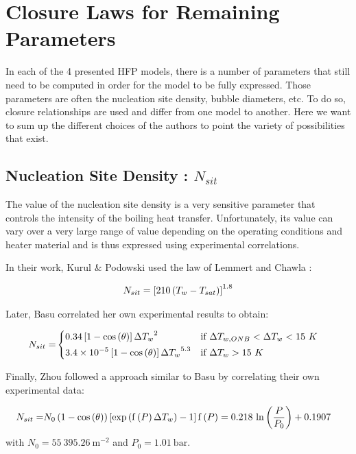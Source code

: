 \section{Closure Laws for Remaining Parameters}

In each of the 4 presented HFP models, there is a number of parameters that still need to be computed in order for the model to be fully expressed. Those parameters are often the nucleation site density, bubble diameters, etc. To do so, closure relationships are used and differ from one model to another. Here we want to sum up the different choices of the authors to point the variety of possibilities that exist.

\subsection{Nucleation Site Density : $N_{sit}$}

The value of the nucleation site density is a very sensitive parameter that controls the intensity of the boiling heat transfer. Unfortunately, its value can vary over a very large range of value depending on the operating conditions and heater material and is thus expressed using experimental correlations.

\npar
In their work, Kurul \& Podowski used the law of Lemmert and Chawla \cite{lemmert}:

\begin{align}
N_{sit}=\left[ 210\left( T_{w}-T_{sat} \right) \right]^{1.8}
\end{align}


\npar
Later, Basu \cite{basu} correlated her own experimental results to obtain:

\begin{align}
N_{sit}=&
\begin{dcases}
0.34\left[ 1-\mathrm{cos}\left( \theta \right) \right] {\Delta T_{w}}^{2} & \text{if } \Delta T_{w,ONB}<\Delta T_{w} < 15\ K\\
3.4\times 10^{-5}\left[ 1-\mathrm{cos}\left( \theta \right) \right] {\Delta T_{w}}^{5.3} & \text{if } \Delta T_{w} > 15\ K
\end{dcases}
\end{align}

\npar

\npar
Finally, Zhou \etal followed a approach similar to Basu \etal by correlating their own experimental data:

\begin{align}
N_{sit} =& N_{0}\left( 1-\mathrm{cos}\left( \theta \right) \right)\left[ \mathrm{exp}\left( \mathrm{f}\left( P \right) \Delta T_{w}  \right) -1  \right]
\mathrm{f}\left( P \right) = 0.218~\mathrm{ln}\left( \dfrac{P}{P_{0}} \right)+0.1907
\end{align}
with $N_{0}=55~395.26\ \mathrm{m}^{-2}$ and $P_{0}=1.01\ \mathrm{bar}$.



